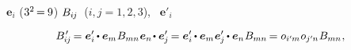 

\label{section:tensoranditscomponents}


~${\bm{e}_i}$   (${3^2 \hspace{-0.24ex}=\hspace{-0.12ex} 9}$)  ${B_{i\hspace{-0.1ex}j}}$~(${i, j = 1, 2, 3}$),
  ~${\bm{e}'_i}$ 

\nopagebreak\vspace{-0.25em}\begin{equation}\label{orthotransform:2}
B\hspace{.16ex}'_{\hspace{-0.33ex}i\hspace{-0.1ex}j} \hspace{-0.2ex}
= \bm{e}'_i \hspace{-0.15ex} \dotp \bm{e}_m \hspace{.1ex} B_{mn} \hspace{.1ex} \bm{e}_n \hspace{-0.3ex} \dotp \bm{e}'_{\hspace{-0.1ex}j} \hspace{-0.2ex}
= \bm{e}'_i \hspace{-0.15ex} \dotp \bm{e}_m \hspace{.1ex} \bm{e}'_{\hspace{-0.1ex}j} \hspace{-0.15ex} \dotp \bm{e}_n \hspace{.1ex} B_{mn} \hspace{-0.2ex}
= \cosinematrix{i'\hspace{-0.1ex}m} \hspace{.1ex} \cosinematrix{j'\hspace{-0.1ex}n} \hspace{.1ex} B_{mn}
\hspace{.1ex} ,
\end{equation}


